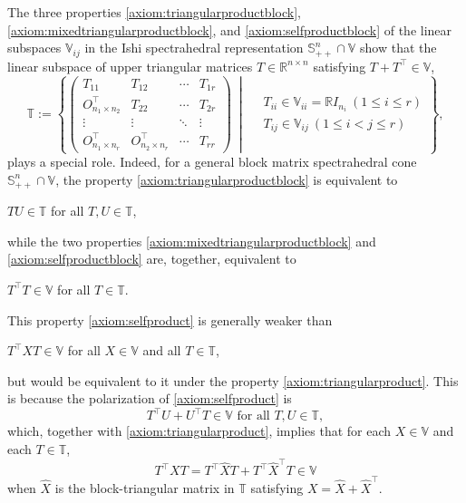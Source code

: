 \documentclass[oneside]{amsart}
\theoremstyle{plain}
\theoremstyle{definition}
\theoremstyle{remark}
\numberwithin{equation}{section}
\begin{document}
The three properties \ref{axiom:triangularproductblock},
\ref{axiom:mixedtriangularproductblock}, and \ref{axiom:selfproductblock}
of the linear subspaces $\mathbb{V}_{ij}$ in the Ishi spectrahedral
representation $\mathbb{S}^{n}_{++} \cap \mathbb{V}$ show that the linear
subspace of upper triangular matrices $T \in \mathbb{R}^{n \times n}$
satisfying $T + T^{\top} \in \mathbb{V}$,
\[
\mathbb{T} := \left\{
\begin{pmatrix}
T_{11} & T_{12} & \cdots & T_{1r}
\\
O_{n_{1} \times n_{2}}^{\top} & T_{22} & \cdots & T_{2r}
\\
\vdots & \vdots & \ddots & \vdots
\\
O_{n_{1} \times n_{r}}^{\top} & O_{n_{2} \times n_{r}}^{\top} & \cdots &
T_{rr}
\end{pmatrix}
\ \middle|\
\begin{aligned}
&T_{ii} \in \mathbb{V}_{ii} = \mathbb{R} I_{n_{i}} \ (1 \leq i \leq r)
\\
&T_{ij} \in \mathbb{V}_{ij} \ (1 \leq i < j \leq r)
\end{aligned}
\right\},
\]
plays a special role. Indeed, for a general block matrix spectrahedral cone
$\mathbb{S}^{n}_{++} \cap \mathbb{V}$, the property
\ref{axiom:triangularproductblock} is equivalent to
\begin{enumerate}[label={[U\arabic*]},ref={[U\arabic*]}]
\item\label{axiom:triangularproduct}%
$T U \in \mathbb{T}$ for all $T, U \in \mathbb{T}$,

\end{enumerate}
while the two properties \ref{axiom:mixedtriangularproductblock} and
\ref{axiom:selfproductblock} are, together, equivalent to
\begin{enumerate}[label={[U\arabic*]},ref={[U\arabic*]}]
\setcounter{enumi}{1}%
\item\label{axiom:selfproduct}%
$T^{\top}  T \in \mathbb{V}$ for all $T \in \mathbb{T}$.

\end{enumerate}
This property \ref{axiom:selfproduct} is generally weaker than
\begin{enumerate}[label={[U\arabic*$'$]},ref={[U\arabic*$'$]}]
\setcounter{enumi}{1}%
\item\label{axiom:selfproductX}%
$T^{\top} X T \in \mathbb{V}$ for all $X \in \mathbb{V}$ and all $T \in
\mathbb{T}$,

\end{enumerate}
but would be equivalent to it under the property
\ref{axiom:triangularproduct}. This is because the polarization of
\ref{axiom:selfproduct} is
\[
T^{\top}  U + U^{\top} T \in \mathbb{V} \text{ for all } T, U \in
\mathbb{T},
\]
which, together with \ref{axiom:triangularproduct}, implies that for each
$X \in \mathbb{V}$ and each $T \in \mathbb{T}$,
\[
T^{\top} X T = T^{\top} \hat{X} T + T^{\top} \hat{X}^{\top} T \in
\mathbb{V}
\]
when $\hat{X}$ is the block-triangular matrix in $\mathbb{T}$ satisfying $X
= \hat{X} + \hat{X}^{\top}$.
\end{document}
